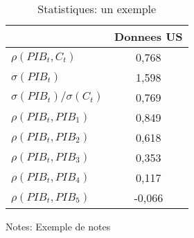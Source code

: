 \begin{table}[H]                                            
\begin{center}                                              
\caption{Statistiques: un exemple} \label{}                 
\begin{tabular}{lc} \toprule\toprule                        
&  Donnees US  \\ \midrule                                  
$\rho(PIB_t, C_t)$  & 0,768  \\                             
$\sigma(PIB_t)$  & 1,598  \\                                
$\sigma(PIB_t)/\sigma(C_t)$  & 0,769  \\                    
$\rho(PIB_t, PIB_{1})$  & 0,849  \\                         
$\rho(PIB_t, PIB_{2})$  & 0,618  \\                         
$\rho(PIB_t, PIB_{3})$  & 0,353  \\                         
$\rho(PIB_t, PIB_{4})$  & 0,117  \\                         
$\rho(PIB_t, PIB_{5})$  & -0,066  \\  \bottomrule\bottomrule
\end{tabular}                                               
\end{center}                                                
\begin{footnotesize}                                        
\flushleft                                                  
Notes: Exemple de notes                                     
\end{footnotesize}                                          
\end{table}                                                 
